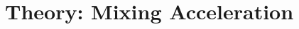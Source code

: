 \documentclass[10pt]{article}
\newcommand{\xbeta}{ x_i \beta}
\newcommand{\be}{\begin{equs}}
\newcommand{\ee}{\end{equs}}
\DeclareMathOperator{\No}{No}
\DeclareMathOperator{\PG}{PG}
\begin{document}
%
%
%
%
%
% 

\section{Theory: Mixing Acceleration}
\end{document}
